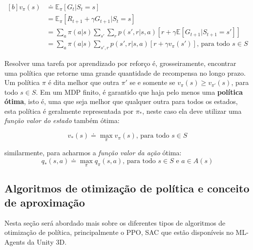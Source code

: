 \begin{equation}
   \begin{aligned}[b]
      v_\pi(s) &\doteq \mathbb{E}_\pi [G_t | S_t = s] \\
      &= \mathbb{E}_\pi [R_{t+1} + \gamma G_{t+1} | S_t = s] \\
      &= \sum_{a}\pi(a|s) \sum_{s'}\sum_{r}p(s', r | s, a)[r+\gamma\mathbb{E}[G_{t+1}|S_{t+1} = s']] \\
      &= \sum_{a}\pi(a|s)\sum_{s', r}p(s', r | s, a)[r + \gamma v_\pi(s')]\text{, para todo } s \in S
   \end{aligned}
   \label{recursive-state-value-function}
\end{equation}

Resolver uma tarefa por aprendizado por reforço é, grosseiramente, encontrar uma política que retorne uma grande quantidade de recompensa no longo prazo. Um política $\pi$ é dita melhor que outra $\pi'$ se e somente se $v_\pi(s) \geqslant v_{\pi'}(s)$, para todo  $s \in S$. Em um MDP finito, é garantido que haja pelo menos uma \textbf{política ótima}, isto é, uma que seja melhor que qualquer outra para todos os estados, esta política é geralmente representada por $\pi_\ast$, neste caso ela deve utilizar uma \textit{função valor do estado} também ótima:

\begin{equation} \label{state-value-optimal-function}
   v_\ast(s) \doteq \max_{\pi}v_\pi(s) \text{, para todo } s \in S
\end{equation}

similarmente, para acharmos a \textit{função valor da ação} ótima:
\begin{equation}\label{action-value-optimal-function}
   q_\ast(s,a) \doteq \max_{\pi}q_\pi(s,a) \text{, para todo } s \in S \text{ e } a \in A(s)
\end{equation}


\subsection{Algoritmos de otimização de política e conceito de aproximação}
Nesta seção será abordado mais sobre os diferentes tipos de algoritmos de otimização de política, principalmente o PPO, SAC que estão disponíveis no ML-Agents da Unity 3D. 

